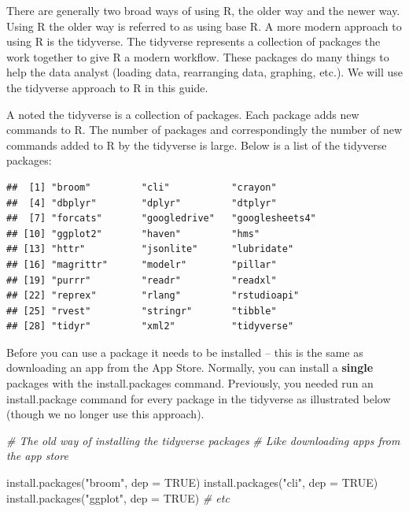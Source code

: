 \documentclass[
]{krantz}
\makeatletter
\newenvironment{Shaded}{\begin{snugshade}}{\end{snugshade}}
\newcommand{\AttributeTok}[1]{\textcolor[rgb]{0.61,0.61,0.61}{#1}}
\newcommand{\CommentTok}[1]{\textcolor[rgb]{0.37,0.37,0.37}{\textit{#1}}}
\newcommand{\ConstantTok}[1]{\textcolor[rgb]{0,0,0}{#1}}
\newcommand{\FunctionTok}[1]{\textcolor[rgb]{0,0,0}{#1}}
\newcommand{\NormalTok}[1]{#1}
\newcommand{\StringTok}[1]{\textcolor[rgb]{0.5,0.5,0.5}{#1}}
\newenvironment{kframe}{%
\medskip{}
\setlength{\fboxsep}{.8em}
 \def\at@end@of@kframe{}%
 \ifinner\ifhmode%
  \def\at@end@of@kframe{\end{minipage}}%
  \begin{minipage}{\columnwidth}%
 \fi\fi%
 \def\FrameCommand##1{\hskip\@totalleftmargin \hskip-\fboxsep
 \colorbox{shadecolor}{##1}\hskip-\fboxsep
     \hskip-\linewidth \hskip-\@totalleftmargin \hskip\columnwidth}%
 \MakeFramed {\advance\hsize-\width
   \@totalleftmargin\z@ \linewidth\hsize
   \@setminipage}}%
 {\par\unskip\endMakeFramed%
 \at@end@of@kframe}
\renewenvironment{Shaded}{\begin{kframe}}{\end{kframe}}
\makeatother
\begin{document}
There are generally two broad ways of using R, the older way and the newer way. Using R the older way is referred to as using base R. A more modern approach to using R is the tidyverse. The tidyverse represents a collection of packages the work together to give R a modern workflow. These packages do many things to help the data analyst (loading data, rearranging data, graphing, etc.). We will use the tidyverse approach to R in this guide.

A noted the tidyverse is a collection of packages. Each package adds new commands to R. The number of packages and correspondingly the number of new commands added to R by the tidyverse is large. Below is a list of the tidyverse packages:

\begin{verbatim}
##  [1] "broom"         "cli"           "crayon"       
##  [4] "dbplyr"        "dplyr"         "dtplyr"       
##  [7] "forcats"       "googledrive"   "googlesheets4"
## [10] "ggplot2"       "haven"         "hms"          
## [13] "httr"          "jsonlite"      "lubridate"    
## [16] "magrittr"      "modelr"        "pillar"       
## [19] "purrr"         "readr"         "readxl"       
## [22] "reprex"        "rlang"         "rstudioapi"   
## [25] "rvest"         "stringr"       "tibble"       
## [28] "tidyr"         "xml2"          "tidyverse"
\end{verbatim}

Before you can use a package it needs to be installed -- this is the same as downloading an app from the App Store. Normally, you can install a \textbf{single} packages with the install.packages command. Previously, you needed run an install.package command for every package in the tidyverse as illustrated below (though we no longer use this approach).

\begin{Shaded}
\begin{Highlighting}[]
\CommentTok{\# The old way of installing the tidyverse packages}
\CommentTok{\# Like downloading apps from the app store}

\FunctionTok{install.packages}\NormalTok{(}\StringTok{"broom"}\NormalTok{, }\AttributeTok{dep =} \ConstantTok{TRUE}\NormalTok{)}
\FunctionTok{install.packages}\NormalTok{(}\StringTok{"cli"}\NormalTok{, }\AttributeTok{dep =} \ConstantTok{TRUE}\NormalTok{)}
\FunctionTok{install.packages}\NormalTok{(}\StringTok{"ggplot"}\NormalTok{, }\AttributeTok{dep =} \ConstantTok{TRUE}\NormalTok{)}
\CommentTok{\# etc}
\end{Highlighting}
\end{Shaded}
\end{document}
